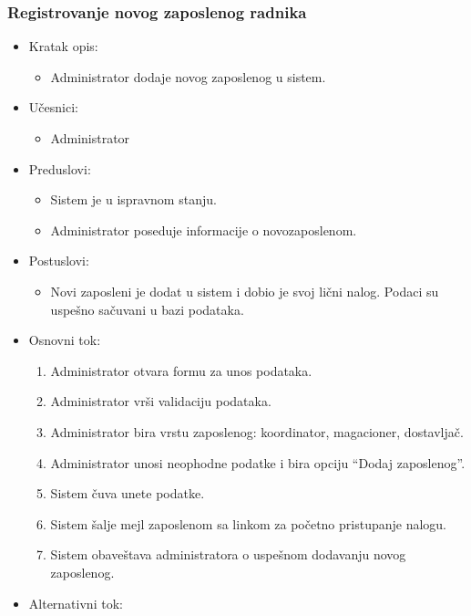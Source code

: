 \subsubsection{Registrovanje novog zaposlenog radnika}

\begin{itemize}
    \item Kratak opis:
        \begin{itemize}
            \item Administrator dodaje novog zaposlenog u sistem.
        \end{itemize}
    \item Učesnici:
        \begin{itemize}
            \item Administrator
        \end{itemize}
    \item Preduslovi:
        \begin{itemize}
            \item Sistem je u ispravnom stanju.
            \item Administrator poseduje informacije o novozaposlenom.
        \end{itemize}
    \item Postuslovi:
        \begin{itemize}
            \item Novi zaposleni je dodat u sistem i dobio je svoj lični nalog. Podaci su uspešno sačuvani u bazi podataka.
        \end{itemize}
    \item Osnovni tok:
        \begin{enumerate}
         \item Administrator otvara formu za unos podataka.
         \item Administrator vrši validaciju podataka.
         \item Administrator bira vrstu zaposlenog: koordinator, magacioner, dostavljač.
         \item Administrator unosi neophodne podatke i bira opciju ``Dodaj zaposlenog''.
         \item Sistem čuva unete podatke.
         \item Sistem šalje mejl zaposlenom sa linkom za početno pristupanje nalogu.
         \item Sistem obaveštava administratora o uspešnom dodavanju novog zaposlenog.
        \end{enumerate}
    \item Alternativni tok:

\end{itemize}
